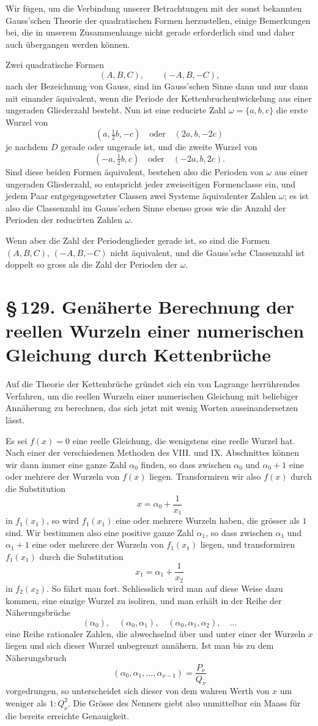 \documentclass[11pt]{article}
\providecommand{\sect}[2]{\section*{\S\,#1. #2}}
\begin{document}
Wir fügen, um die Verbindung unserer Betrachtungen mit der sonst bekannten Gauss'schen Theorie der quadratischen Formen herzustellen, einige Bemerkungen bei, die in unserem Zusammenhange nicht gerade erforderlich sind und daher auch übergangen werden können.

Zwei quadratische Formen
\[
        (A,B,C),\qquad (-A,B,-C),
\]
nach der Bezeichnung von Gauss, sind im Gauss'schen Sinne dann und nur dann mit einander äquivalent, wenn die Periode der Kettenbruchentwickelung aus einer ungeraden Gliederzahl besteht. Nun ist eine reducirte Zahl $\omega=\{a,b,c\}$ die erste Wurzel von
\[
        (a,\tfrac12 b,-c)\quad\text{oder}\quad(2a,b,-2c)
\]
je nachdem $D$ gerade oder ungerade ist, und die zweite Wurzel von
\[
        (-a,\tfrac12 b,c)\quad\text{oder}\quad(-2a,b,2c).
\]
Sind diese beiden Formen äquivalent, bestehen also die Perioden von $\omega$ aus einer ungeraden Gliederzahl, so entspricht jeder zweiseitigen Formenclasse ein, und jedem Paar entgegengesetzter Classen zwei Systeme äquivalenter Zahlen $\omega$; es ist also die Classenzahl im Gauss'schen Sinne ebenso gross wie die Anzahl der Perioden der reducirten Zahlen $\omega$.

Wenn aber die Zahl der Periodenglieder gerade ist, so sind die Formen $(A,B,C)$, $(-A,B,-C)$ nicht äquivalent, und die Gauss'sche Classenzahl ist doppelt so gross als die Zahl der Perioden der $\omega$.

\sect{129}{Genäherte Berechnung der reellen Wurzeln einer numerischen Gleichung durch Kettenbrüche}

Auf die Theorie der Kettenbrüche gründet sich ein von Lagrange herrührendes Verfahren, um die reellen Wurzeln einer numerischen Gleichung mit beliebiger Annäherung zu berechnen, das sich jetzt mit wenig Worten auseinandersetzen lässt.

Es sei $f(x)=0$ eine reelle Gleichung, die wenigstens eine reelle Wurzel hat. Nach einer der verschiedenen Methoden des VIII. und IX. Abschnittes können wir dann immer eine ganze Zahl $\alpha_0$ finden, so dass zwischen $\alpha_0$ und $\alpha_0+1$ eine oder mehrere der Wurzeln von $f(x)$ liegen. Transformiren wir also $f(x)$ durch die Substitution
\[
        x=\alpha_0+\frac1{x_1}
\]
in $f_1(x_1)$, so wird $f_1(x_1)$ eine oder mehrere Wurzeln haben, die grösser als $1$ sind. Wir bestimmen also eine positive ganze Zahl $\alpha_1$, so dass zwischen $\alpha_1$ und $\alpha_1+1$ eine oder mehrere der Wurzeln von $f_1(x_1)$ liegen, und transformiren $f_1(x_1)$ durch die Substitution
\[
        x_1=\alpha_1+\frac1{x_2}
\]
in $f_2(x_2)$. So fährt man fort. Schliesslich wird man auf diese Weise dazu kommen, eine einzige Wurzel zu isoliren, und man erhält in der Reihe der Näherungsbrüche
\[
        (\alpha_0),\quad(\alpha_0,\alpha_1),\quad
        (\alpha_0,\alpha_1,\alpha_2),\quad\ldots
\]
eine Reihe rationaler Zahlen, die abwechselnd über und unter einer der Wurzeln $x$ liegen und sich dieser Wurzel unbegrenzt annähern. Ist man bis zu dem Näherungsbruch
\[
        (\alpha_0,\alpha_1,\ldots,\alpha_{\nu-1})=\frac{P_\nu}{Q_\nu}
\]
vorgedrungen, so unterscheidet sich dieser von dem wahren Werth von $x$ um weniger als $1:Q_\nu^2$. Die Grösse des Nenners giebt also unmittelbar ein Maass für die bereits erreichte Genauigkeit.
\end{document}
